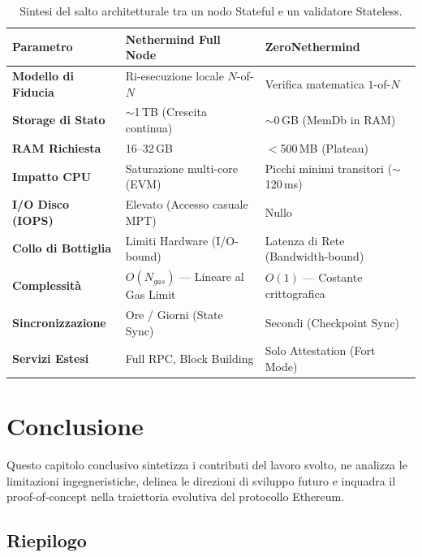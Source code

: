 \documentclass[12pt,a4paper,openright,twoside]{report}
\begin{document}
\begin{table}[H]
\centering
\renewcommand{\arraystretch}{1.3}
\begin{tabular}{l p{5.5cm} p{5.5cm}}
\hline
\textbf{Parametro} & \textbf{Nethermind Full Node} & \textbf{ZeroNethermind} \\
\hline
\textbf{Modello di Fiducia} & Ri-esecuzione locale $N$-of-$N$ & Verifica matematica $1$-of-$N$ \\
\textbf{Storage di Stato} & $\sim$1\,TB (Crescita continua) & $\sim$0\,GB (MemDb in RAM) \\
\textbf{RAM Richiesta} & 16--32\,GB & $<$500\,MB (Plateau) \\
\textbf{Impatto CPU} & Saturazione multi-core (EVM) & Picchi minimi transitori ($\sim$120\,ms) \\
\textbf{I/O Disco (IOPS)} & Elevato (Accesso casuale MPT) & Nullo \\
\textbf{Collo di Bottiglia} & Limiti Hardware (I/O-bound) & Latenza di Rete (Bandwidth-bound) \\
\textbf{Complessità} & $O(N_{gas})$ --- Lineare al Gas Limit & $O(1)$ --- Costante crittografica \\
\textbf{Sincronizzazione} & Ore / Giorni (State Sync) & Secondi (Checkpoint Sync) \\
\textbf{Servizi Estesi} & Full RPC, Block Building & Solo Attestation (Fort Mode) \\
\hline
\end{tabular}
\caption{Sintesi del salto architetturale tra un nodo Stateful e un validatore Stateless.}
\label{tab:confronto_finale}
\end{table}


\chapter{Conclusione}\label{chap:conclusione}

Questo capitolo conclusivo sintetizza i contributi del lavoro svolto, ne analizza le limitazioni ingegneristiche, delinea le direzioni di sviluppo futuro e inquadra il proof-of-concept nella traiettoria evolutiva del protocollo Ethereum.

\section{Riepilogo}
\end{document}
